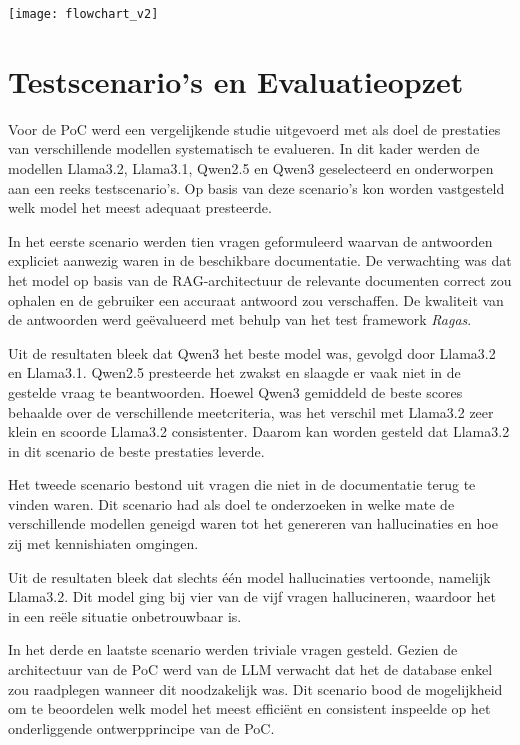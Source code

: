 \documentclass[a0,portrait]{hogent-poster}
\begin{document}
\begin{multicols}{2}
\begin{center}
    \captionsetup{type=figure}
    \texttt{[image: flowchart\_v2]}
    \label{fig:PoC_RAG}
\end{center}

\section{Testscenario’s en Evaluatieopzet}

Voor de PoC werd een vergelijkende studie uitgevoerd met als doel de prestaties van verschillende modellen systematisch te evalueren. In dit kader werden de modellen Llama3.2, Llama3.1, Qwen2.5 en Qwen3 geselecteerd en onderworpen aan een reeks testscenario’s. Op basis van deze scenario’s kon worden vastgesteld welk model het meest adequaat presteerde.

In het eerste scenario werden tien vragen geformuleerd waarvan de antwoorden expliciet aanwezig waren in de beschikbare documentatie. De verwachting was dat het model op basis van de RAG-architectuur de relevante documenten correct zou ophalen en de gebruiker een accuraat antwoord zou verschaffen. De kwaliteit van de antwoorden werd geëvalueerd met behulp van het test framework \textit{Ragas}. 

Uit de resultaten bleek dat Qwen3 het beste model was, gevolgd door Llama3.2 en Llama3.1. Qwen2.5 presteerde het zwakst en slaagde er vaak niet in de gestelde vraag te beantwoorden. Hoewel Qwen3 gemiddeld de beste scores behaalde over de verschillende meetcriteria, was het verschil met Llama3.2 zeer klein en scoorde Llama3.2 consistenter. Daarom kan worden gesteld dat Llama3.2 in dit scenario de beste prestaties leverde. 

Het tweede scenario bestond uit vragen die niet in de documentatie terug te vinden waren. Dit scenario had als doel te onderzoeken in welke mate de verschillende modellen geneigd waren tot het genereren van hallucinaties en hoe zij met kennishiaten omgingen.  

Uit de resultaten bleek dat slechts één model hallucinaties vertoonde, namelijk Llama3.2. Dit model ging bij vier van de vijf vragen hallucineren, waardoor het in een reële situatie onbetrouwbaar is.

In het derde en laatste scenario werden triviale vragen gesteld. Gezien de architectuur van de PoC werd van de LLM verwacht dat het de database enkel zou raadplegen wanneer dit noodzakelijk was. Dit scenario bood de mogelijkheid om te beoordelen welk model het meest efficiënt en consistent inspeelde op het onderliggende ontwerpprincipe van de PoC.  


\end{multicols}
\end{document}
